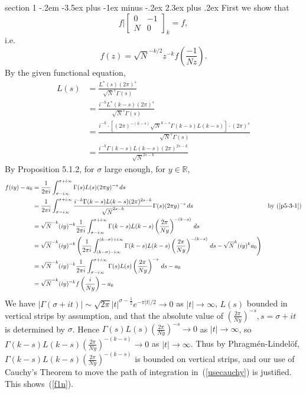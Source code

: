 \documentclass[12pt]{article}
\makeatletter
\theoremstyle{norm}
\newcommand{\R}[0]{\mathbb{R}}
\newcommand{\rc}[1]{\frac{1}{#1}}
\newcommand{\Ga}[0]{\Gamma}
\newcommand{\si}[0]{\sigma}
\newcommand{\pa}[1]{\left( {#1} \right)}
\newcommand{\by}[1]{\text{by~(\ref{#1})}}
\newcommand{\pf}[2]{\pa{\frac{#1}{#2}}}
\newcommand{\smatt}[4]{
\left[
\begin{smallmatrix}
{#1}&{#2}\\
{#3}&{#4}
\end{smallmatrix}
\right]}
\newcommand{\iy}[0]{\infty}
\newenvironment{problem}{\@startsection
       {section}
       {1}
       {-.2em}
       {-3.5ex plus -1ex minus -.2ex}
       {2.3ex plus .2ex}
       {\pagebreak[3]%
       \large\bf\noindent{Problem }
       }
       }
       {%
       }
\makeatother
\begin{document}
\begin{problem}{\it }
First we show that 
\begin{equation}\label{f1n}
f|\smatt 0{-1}{N}0_k=f,
\end{equation}
i.e. 
\[f(z)=\sqrt{N}^{-k/2}z^{-k} f\pf{-1}{Nz}.\] 
By the given functional equation,
\begin{align}
\nonumber
L(s)&=\frac{L^*(s)(2\pi)^s}{\sqrt N^s\Ga(s)}\\
\nonumber
&=\frac{i^{-k}L^*(k-s)(2\pi)^s}{\sqrt N^s\Ga(s)}\\
\nonumber
&=\frac{i^{-k}\cdot[(2\pi)^{-(k-s)}\sqrt N^{k-s}\Ga(k-s)L(k-s)]\cdot (2\pi)^s}{\sqrt N^s\Ga(s)}\\
\label{p5-3-1}
&=\frac{i^{-k}\Ga(k-s)L(k-s)(2\pi)^{2s-k}}{\sqrt N^{2s-k} }
\end{align}
By Proposition 5.1.2, for $\si$ large enough, for $y\in \R$,
\begin{align}
\nonumber
f(iy)-a_0&=\rc{2\pi i}\int_{\si-i\iy}^{\si+i\iy}\Ga(s)L(s)(2\pi y)^{-s}\,ds\\
\nonumber
&=\rc{2\pi i}\int_{\si-i\iy}^{\si+i\iy} 
\frac{i^{-k}\Ga(k-s)L(k-s)(2\pi)^{2s-k}}{\sqrt N^{2s-k} }%
\Ga(s)(2\pi y)^{-s}\,ds&\by{p5-3-1}\\
\nonumber
&=\sqrt{N}^{-k}(iy)^{-k} \rc{2\pi i}\int_{\si-i\iy}^{\si+i\iy}\Ga(k-s) L(k-s) \pf{2\pi}{Ny}^{-(k-s)}\,ds\\
\label{usecauchy}
&=\sqrt{N}^{-k}(iy)^{-k} \pa{\rc{2\pi i}\int_{(k-\si)-i\iy}^{(k-\si)+i\iy}\Ga(k-s) L(k-s) \pf{2\pi}{Ny}^{-(k-s)}\,ds-\sqrt N^{k}(iy)^k a_0}\\
\nonumber
&=\sqrt{N}^{-k}(iy)^{-k} \rc{2\pi i}\int_{\si-i\iy}^{\si+i\iy}\Ga(s) L(s) \pf{2\pi}{Ny}^{-s}\,ds-a_0\\
\nonumber
&=\sqrt{N}^{-k} (iy)^{-k} f\pf{i}{Ny}-a_0
\end{align}
We have $|\Ga(\si+it)|\sim\sqrt{2\pi} |t|^{\si-\rc 2}e^{-\pi |t|/2}\to 0$ as $|t|\to \iy$, $L(s)$ bounded in vertical strips by assumption, and that the absolute value of $\pf{2\pi}{Ny}^{-s},s=\si+it$ is determined by $\si$. Hence $\Ga(s)L(s)\pf{2\pi}{Ny}^{-s}\to 0$ as $|t|\to\iy$, so $\Ga(k-s)L(k-s)\pf{2\pi}{Ny}^{-(k-s)}\to 0$ as $|t|\to\iy$. Thus by Phragm\'en-Lindel\"of, $\Ga(k-s)L(k-s)\pf{2\pi}{Ny}^{-(k-s)}$ is bounded on vertical strips, and our use of Cauchy's Theorem to move the path of integration in~(\ref{usecauchy}) is justified.
This shows~(\ref{f1n}).


\end{problem}
\end{document}
